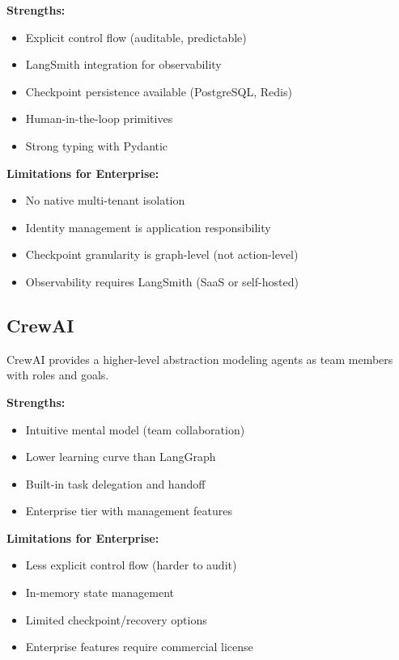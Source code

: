 \textbf{Strengths:}
\begin{itemize}
    \item Explicit control flow (auditable, predictable)
    \item LangSmith integration for observability
    \item Checkpoint persistence available (PostgreSQL, Redis)
    \item Human-in-the-loop primitives
    \item Strong typing with Pydantic
\end{itemize}

\textbf{Limitations for Enterprise:}
\begin{itemize}
    \item No native multi-tenant isolation
    \item Identity management is application responsibility
    \item Checkpoint granularity is graph-level (not action-level)
    \item Observability requires LangSmith (SaaS or self-hosted)
\end{itemize}

\subsection{CrewAI}
\label{subsec:crewai}

CrewAI provides a higher-level abstraction modeling agents as team members with roles and goals.

\textbf{Strengths:}
\begin{itemize}
    \item Intuitive mental model (team collaboration)
    \item Lower learning curve than LangGraph
    \item Built-in task delegation and handoff
    \item Enterprise tier with management features
\end{itemize}

\textbf{Limitations for Enterprise:}
\begin{itemize}
    \item Less explicit control flow (harder to audit)
    \item In-memory state management
    \item Limited checkpoint/recovery options
    \item Enterprise features require commercial license
\end{itemize}

